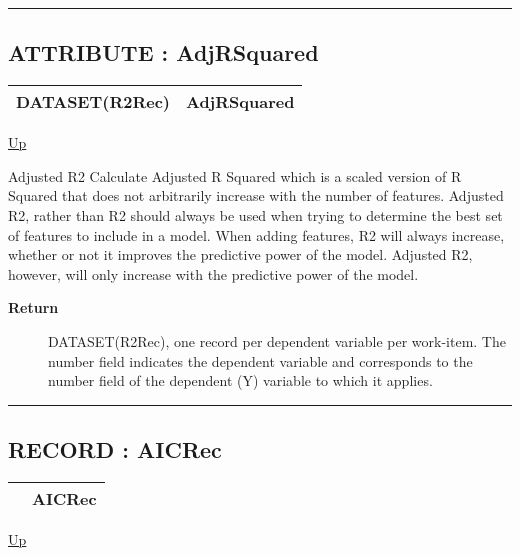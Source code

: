 \rule{\textwidth}{0.4pt}
\subsection*{ATTRIBUTE : AdjRSquared}
\hypertarget{ecldoc:linearregression.ols.adjrsquared}{}

{\renewcommand{\arraystretch}{1.5}
\begin{tabularx}{\textwidth}{|>{\raggedright\arraybackslash}l|X|}
\hline
\hspace{0pt}DATASET(R2Rec) & AdjRSquared \\
\hline
\end{tabularx}
}

\hyperlink{ecldoc:linearregression.ols}{Up}

\par
Adjusted R2 Calculate Adjusted R Squared which is a scaled version of R Squared that does not arbitrarily increase with the number of features. Adjusted R2, rather than R2 should always be used when trying to determine the best set of features to include in a model. When adding features, R2 will always increase, whether or not it improves the predictive power of the model. Adjusted R2, however, will only increase with the predictive power of the model.

\par
\begin{description}
\item [\textbf{Return}] DATASET(R2Rec), one record per dependent variable per work-item. The number field indicates the dependent variable and corresponds to the number field of the dependent (Y) variable to which it applies.
\end{description}

\rule{\textwidth}{0.4pt}
\subsection*{RECORD : AICRec}
\hypertarget{ecldoc:linearregression.ols.aicrec}{}

{\renewcommand{\arraystretch}{1.5}
\begin{tabularx}{\textwidth}{|>{\raggedright\arraybackslash}l|X|}
\hline
\hspace{0pt} & AICRec \\
\hline
\end{tabularx}
}

\hyperlink{ecldoc:linearregression.ols}{Up}

\par


